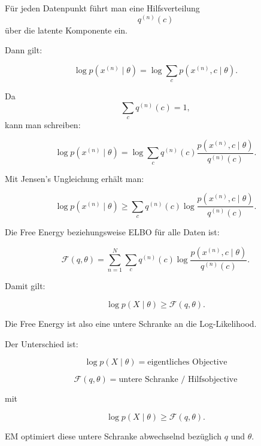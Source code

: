 \documentclass[11pt,a4paper]{scrartcl}
\begin{document}
\begin{calculationbox}
    Für jeden Datenpunkt führt man eine Hilfsverteilung
    \[
        q^{(n)}(c)
    \]
    über die latente Komponente ein.

    Dann gilt:

    \[
        \log p(x^{(n)}\mid \theta)
        =
        \log
        \sum_c
        p(x^{(n)},c\mid \theta).
    \]

    Da
    \[
        \sum_c q^{(n)}(c)=1,
    \]
    kann man schreiben:

    \[
        \log p(x^{(n)}\mid \theta)
        =
        \log
        \sum_c
        q^{(n)}(c)
        \frac{
            p(x^{(n)},c\mid \theta)
        }{
            q^{(n)}(c)
        }.
    \]

    Mit Jensen's Ungleichung erhält man:

    \[
        \log p(x^{(n)}\mid \theta)
        \geq
        \sum_c
        q^{(n)}(c)
        \log
        \frac{
            p(x^{(n)},c\mid \theta)
        }{
            q^{(n)}(c)
        }.
    \]
\end{calculationbox}

\begin{calculationbox}
    Die Free Energy beziehungsweise ELBO für alle Daten ist:

    \[
        \mathcal{F}(q,\theta)
        =
        \sum_{n=1}^{N}
        \sum_c
        q^{(n)}(c)
        \log
        \frac{
            p(x^{(n)},c\mid \theta)
        }{
            q^{(n)}(c)
        }.
    \]

    Damit gilt:

    \[
        \log p(X\mid \theta)
        \geq
        \mathcal{F}(q,\theta).
    \]

    Die Free Energy ist also eine untere Schranke an die Log-Likelihood.
\end{calculationbox}

\begin{answerbox}
    Der Unterschied ist:

    \[
        \boxed{
            \log p(X\mid \theta)
            =
            \text{eigentliches Objective}
        }
    \]

    \[
        \boxed{
            \mathcal{F}(q,\theta)
            =
            \text{untere Schranke / Hilfsobjective}
        }
    \]

    mit

    \[
        \boxed{
            \log p(X\mid \theta)
            \geq
            \mathcal{F}(q,\theta).
        }
    \]

    EM optimiert diese untere Schranke abwechselnd bezüglich \(q\) und
    \(\theta\).
\end{answerbox}
\end{document}

